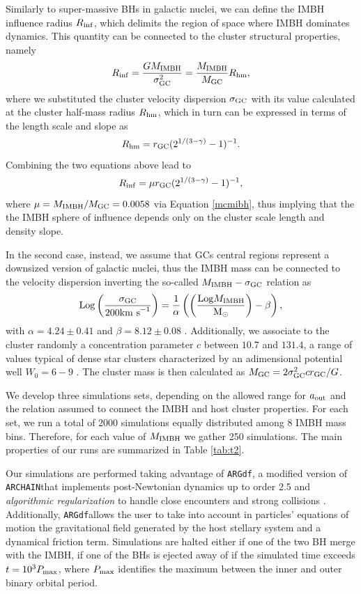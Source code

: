 \documentclass[twocolumn]{aastex62}
\newcommand{\Log}{{\rm Log}}
\newcommand{\Ms}{{\rm M}_\odot}
\newcommand{\gc}{{\rm GC}}
\newcommand{\ibh}{{\rm IMBH}}
\newcommand{\out}{{\rm out}}
\newcommand{\ARGdf}{\texttt{ARGdf}}
\newcommand{\ARCHAIN}{\texttt{ARCHAIN}}
\begin{document}
Similarly to super-massive BHs in galactic nuclei, we can define the IMBH influence radius $R_{\rm inf}$, which delimits the region of space where IMBH dominates dynamics. This quantity can be connected to the cluster structural properties, namely
 \begin{equation}
 R_{\rm inf} = \frac{GM_\ibh}{\sigma_\gc^2} = \frac{M_\ibh}{M_\gc}R_{\rm hm},
 \end{equation}
 where we substituted the cluster velocity dispersion $\sigma_\gc$ with its value calculated at the cluster half-mass radius $R_{\rm hm}$, which in turn can be expressed in terms of the length scale and slope as
\begin{equation}
R_{\rm hm} = r_\gc(2^{1/(3-\gamma)}-1)^{-1}.
\end{equation} 
Combining the two equations above lead to 
\begin{equation}
R_{\rm inf} = \mu r_\gc(2^{1/(3-\gamma)}-1)^{-1},
\end{equation}
where $\mu = M_\ibh/M_\gc = 0.0058$ via Equation \ref{mcmibh}, thus implying that the the IMBH sphere of influence depends only on the cluster scale length and density slope. 

In the second case, instead, we assume that GCs central regions represent a downsized version of galactic nuclei, thus the IMBH mass can be connected to the velocity dispersion inverting the so-called $M_\ibh - \sigma_\gc$ relation as 
\begin{equation}
     \Log \left(\frac{\sigma_\gc}{200{\rm km~s}^{-1}}\right) = \frac{1}{\alpha}\left(\left(\frac{\Log M_\ibh}{\Ms}\right) - \beta\right) ,
\end{equation}
with $\alpha = 4.24\pm0.41$ and $\beta=8.12\pm 0.08$ \citep{gultekin09}. Additionally, we associate to the cluster randomly a concentration parameter $c$ between $10.7$ and $131.4$, a range of values typical of dense star clusters characterized by an adimensional potential well $W_0 = 6-9$ \citep{king62}. The cluster mass is then calculated as $M_\gc = 2\sigma_\gc^2 c r_\gc / G$.

We develop three simulations sets, depending on the allowed range for $a_\out$ and the relation assumed to connect the IMBH and host cluster properties. For each set, we run a total of 2000 simulations equally distributed among 8 IMBH mass bins. Therefore, for each value of $M_\ibh$ we gather 250 simulations. The main properties of our runs are summarized in Table \ref{tab:t2}.

Our simulations are performed taking advantage of \ARGdf \citep{ASCD19}, a modified version of \ARCHAIN that implements post-Newtonian dynamics up to order 2.5 and {\it algorithmic regularization} to handle close encounters and strong collisions \citep{mikkola99,mikkola08}. Additionally, \ARGdf allows the user to take into account in particles' equations of motion the gravitational field generated by the host stellary system and a dynamical friction term. Simulations are halted either if one of the two BH merge with the IMBH, if one of the BHs is ejected away of if the simulated time exceeds $t = 10^3 P_{\rm max}$, where $P_{\rm max}$ identifies the maximum between the inner and outer binary orbital period.
\end{document}
